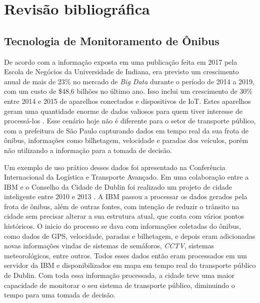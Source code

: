 \chapter{Revisão bibliográfica}
\label{Cap:RevisaoBibliografica}
\newcommand{\WidthAlgumaCoisa}{6.5 cm}



\section{Tecnologia de Monitoramento de Ônibus}

\indent
\par De acordo com a informação exposta em uma publicação feita em 2017 pela Escola de Negócios da Universidade de Indiana, era previsto um crescimento anual de mais de 23\% no mercado de \textit{Big Data} durante o período de 2014 a 2019, com um custo de \$48,6 bilhões no último ano. Isso inclui um crescimento de 30\% entre 2014 e 2015 de aparelhos conectados e dispositivos de IoT. Estes aparelhos geram uma quantidade enorme de dados valiosos para quem tiver interesse de processá-los \cite{Lee2017}. Esse cenário hoje não é diferente para o setor de transporte público, com a prefeitura de São Paulo capturando dados em tempo real da sua frota de ônibus, informações como bilhetagem, velocidade e paradas dos veículos, porém não utilizando a informação para a tomada de decisão.

\par Um exemplo de uso prático desses dados foi apresentado na Conferência Internacional da Logística e Transporte Avançado. Em uma colaboração entre a IBM e o Conselho da Cidade de Dublin foi realizado um projeto de cidade inteligente entre 2010 e 2013 \cite{BenAyed2015}. A IBM passou a processar os dados gerados pela frota de ônibus, além de outras fontes, com intenção de reduzir o trânsito na cidade sem precisar alterar a sua estrutura atual, que conta com vários pontos históricos. O inicio do processo se dava com informações coletadas do ônibus, como dados de GPS, velocidade, paradas e bilhetagem, e depois eram adicionadas novas informações vindas de sistemas de semáforos, \textit{CCTV}, sistemas meteorológicos, entre outros. Todos esses dados então eram processados em um servidor da IBM e disponibilizados em mapa em tempo real do transporte público de Dublin. Com toda essa informação processada, a cidade teve uma maior capacidade de monitorar o seu sistema de transporte público, diminuindo o tempo para uma tomada de decisão.

